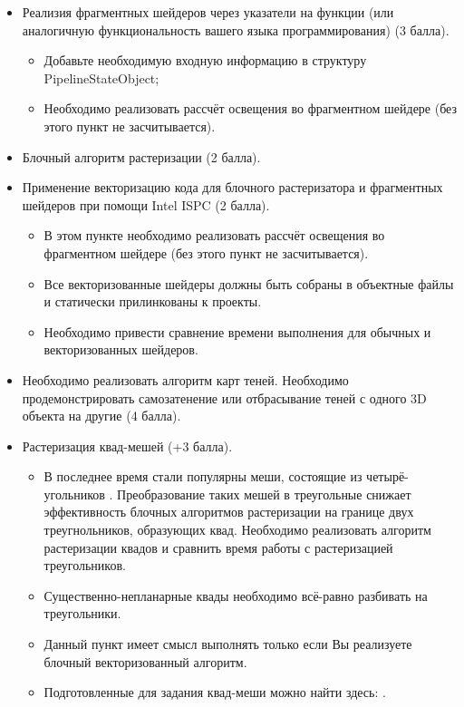 \documentclass[12pt,subf,href,colorlinks=true]{article}
\begin{document}
\begin{itemize}
	\item Реализия фрагментных шейдеров через указатели на функции (или аналогичную функциональность вашего языка программирования) (3 балла).
	
	\begin{itemize}
	  \item Добавьте необходимую входную информацию в структуру PipelineStateObject;	
	  \item Необходимо реализовать рассчёт освещения во фрагментном шейдере (без этого пункт не засчитывается).
	\end{itemize}

    \item Блочный алгоритм растеризации (2 балла).
    
    \item Применение векторизацию кода для блочного растеризатора и фрагментных шейдеров при помощи Intel ISPC (2 балла).
    
    \begin{itemize}
      \item В этом пункте необходимо реализовать рассчёт освещения во фрагментном шейдере (без этого пункт не засчитывается).
      \item Все векторизованные шейдеры должны быть собраны в объектные файлы и статически прилинкованы к проекты.
      \item Необходимо привести сравнение времени выполнения для обычных и векторизованных шейдеров.
    \end{itemize}
	
	\item Необходимо реализовать алгоритм карт теней. Необходимо продемонстрировать самозатенение или отбрасывание теней с одного 3D объекта на другие (4 балла).
	
	\item Растеризация квад-мешей  (+3 балла).
	\begin{itemize}
	  \item В последнее время стали популярны меши, состоящие из четырё-угольников \cite{quadmeshes_about}. Преобразование таких мешей в треугольные снижает эффективность блочных алгоритмов растеризации на границе двух треугнольников, образующих квад. Необходимо реализовать алгоритм растеризации квадов и сравнить время работы с растеризацией треугольников.
	  
	  \item Существенно-непланарные квады необходимо всё-равно разбивать на треугольники.
	  
	  \item Данный пункт имеет смысл выполнять только если Вы реализуете блочный векторизованный алгоритм. 
	  
	  \item Подготовленные для задания квад-меши можно найти здесь: \cite{quadmeshes}. 
	   
	\end{itemize}
	
\end{itemize}
\end{document}
